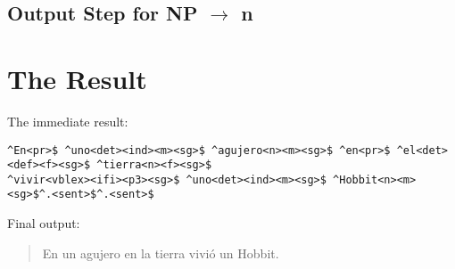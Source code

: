 \documentclass{article}
\begin{document}
\subsection{Output Step for NP $\rightarrow$ n}
\begin{forest}
\end{forest}

\section{The Result}

The immediate result:

\begin{verbatim}
^En<pr>$ ^uno<det><ind><m><sg>$ ^agujero<n><m><sg>$ ^en<pr>$ ^el<det><def><f><sg>$ ^tierra<n><f><sg>$
^vivir<vblex><ifi><p3><sg>$ ^uno<det><ind><m><sg>$ ^Hobbit<n><m><sg>$^.<sent>$^.<sent>$
\end{verbatim}

Final output:

\begin{quote}
    En un agujero en la tierra vivió un Hobbit.
\end{quote}
\end{document}
